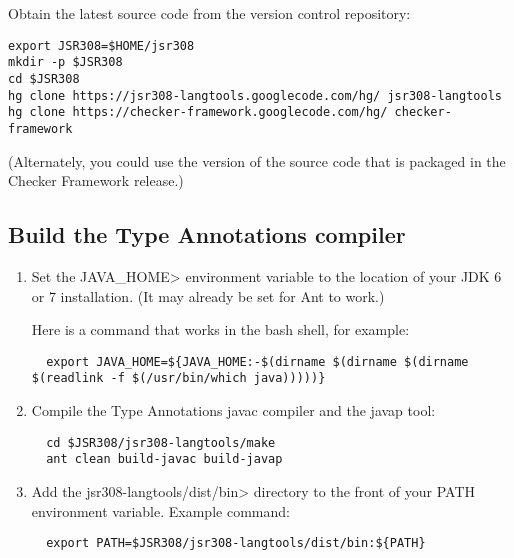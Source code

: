 Obtain the latest source code from the version control repository:

\begin{Verbatim}
export JSR308=$HOME/jsr308
mkdir -p $JSR308
cd $JSR308
hg clone https://jsr308-langtools.googlecode.com/hg/ jsr308-langtools
hg clone https://checker-framework.googlecode.com/hg/ checker-framework
\end{Verbatim}

\noindent
(Alternately, you could use the version of the source code that is packaged
in the Checker Framework release.)


\subsection{Build the Type Annotations compiler}

\begin{enumerate}
\item
Set the \<JAVA\_HOME> environment variable to the location of your JDK 6 or
7 installation.  (It may already be set for Ant to work.)

Here is a command that works in the bash shell, for example:
\begin{Verbatim}
  export JAVA_HOME=${JAVA_HOME:-$(dirname $(dirname $(dirname $(readlink -f $(/usr/bin/which java)))))}
\end{Verbatim}
\item
Compile the Type Annotations javac compiler and the javap tool:

\begin{Verbatim}
  cd $JSR308/jsr308-langtools/make
  ant clean build-javac build-javap
\end{Verbatim}

\item
 Add the \<jsr308-langtools/dist/bin> directory to the front of your PATH environment variable.
  Example command:

\begin{Verbatim}
  export PATH=$JSR308/jsr308-langtools/dist/bin:${PATH}
\end{Verbatim}

\end{enumerate}



